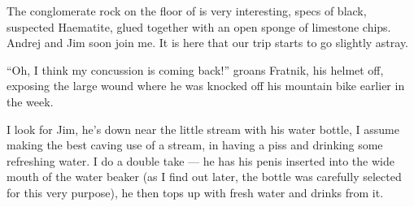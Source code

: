 The conglomerate rock on the floor of  is
very interesting, specs of black, suspected Haematite, glued together
with an open sponge of limestone chips. Andrej and Jim soon join me. It
is here that our trip starts to go slightly astray.

``Oh, I think my concussion is coming back!'' groans Fratnik, his helmet
off, exposing the large wound where he was knocked off his mountain bike
earlier in the week.

I look for Jim, he's down near the little stream with his water bottle,
I assume making the best caving use of a stream, in having a piss and
drinking some refreshing water. I do a double take --- he has his penis
inserted into the wide mouth of the water beaker (as I find out later,
the bottle was carefully selected for this very purpose), he then tops
up with fresh water and drinks from it.


